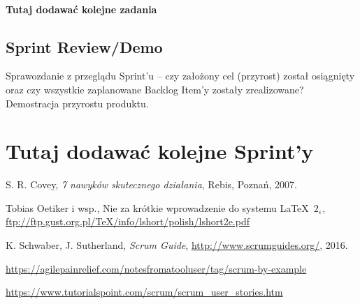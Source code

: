 \documentclass[a4paper]{article}
\begin{document}
\paragraph{Tutaj dodawać kolejne zadania}


\subsection{Sprint Review/Demo}
Sprawozdanie z przeglądu Sprint'u -- czy założony cel (przyrost) został osiągnięty oraz czy wszystkie zaplanowane Backlog Item'y zostały zrealizowane? Demostracja przyrostu produktu.

\section*{Tutaj dodawać kolejne Sprint'y}


\begin{thebibliography}{9}

 S. R. Covey, {\em 7 nawyków skutecznego działania}, Rebis, Poznań, 2007.

 Tobias Oetiker i wsp., Nie za krótkie wprowadzenie do systemu \LaTeX  \ $2_\varepsilon$, \url{ftp://ftp.gust.org.pl/TeX/info/lshort/polish/lshort2e.pdf}

 K. Schwaber, J. Sutherland, {\em Scrum Guide}, \url{http://www.scrumguides.org/}, 2016.

 \url{https://agilepainrelief.com/notesfromatooluser/tag/scrum-by-example}

 \url{https://www.tutorialspoint.com/scrum/scrum_user_stories.htm}

\end{thebibliography}
\end{document}
